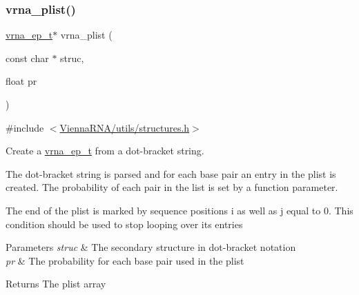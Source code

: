 \subsubsection{\texorpdfstring{vrna\_plist()}{vrna\_plist()}}
{\footnotesize\ttfamily \mbox{\hyperlink{group__struct__utils__plist_gab9ac98ab55ded9fb90043b024b915aca}{vrna\+\_\+ep\+\_\+t}}$\ast$ vrna\+\_\+plist (\begin{DoxyParamCaption}\item[{const char $\ast$}]{struc,  }\item[{float}]{pr }\end{DoxyParamCaption})}



{\ttfamily \#include $<$\mbox{\hyperlink{utils_2structures_8h}{Vienna\+R\+N\+A/utils/structures.\+h}}$>$}



Create a \mbox{\hyperlink{group__struct__utils__plist_gab9ac98ab55ded9fb90043b024b915aca}{vrna\+\_\+ep\+\_\+t}} from a dot-\/bracket string. 

The dot-\/bracket string is parsed and for each base pair an entry in the plist is created. The probability of each pair in the list is set by a function parameter.

The end of the plist is marked by sequence positions i as well as j equal to 0. This condition should be used to stop looping over its entries


\begin{DoxyParams}{Parameters}
{\em struc} & The secondary structure in dot-\/bracket notation \\
\hline
{\em pr} & The probability for each base pair used in the plist \\
\hline
\end{DoxyParams}
\begin{DoxyReturn}{Returns}
The plist array 
\end{DoxyReturn}
